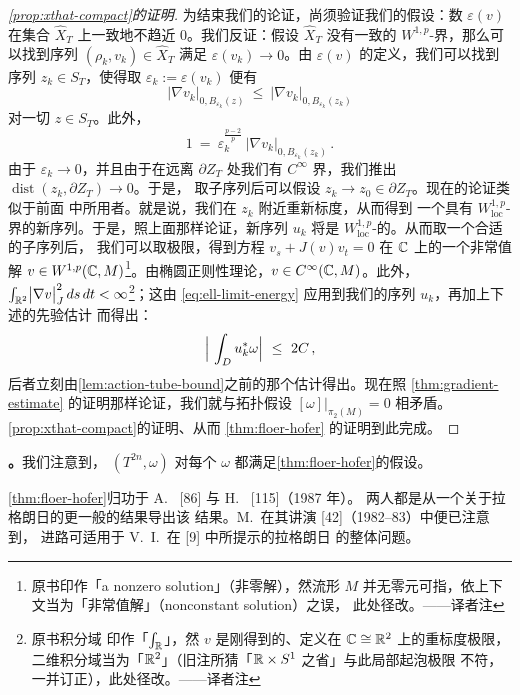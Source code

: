 \begin{proof}[\cref*{prop:xthat-compact}的证明]
为结束我们的论证，尚须验证我们的假设：数 $\varepsilon(v)$ 在集合%
$\hat{X}_{T}$ 上一致地不趋近 $0$。我们反证：假设 $\hat{X}_{T}$ 没有一致的%
$W^{1,p}$-界，那么可以找到序列 $(\rho_{k},v_{k})\in\hat{X}_{T}$ 满足%
$\varepsilon(v_{k})\to0$。由 $\varepsilon(v)$ 的定义，我们可以找到序列%
$z_{k}\in S_{T}$，使得取 $\varepsilon_{k}:=\varepsilon(v_{k})$ 便有
\[
\bigl|\nabla v_{k}\bigr|_{0,B_{\varepsilon_{k}}(z)}\ \leq\ \bigl|\nabla v_{k}\bigr|_{0,B_{\varepsilon_{k}}(z_{k})}
\]
对一切 $z\in S_{T}$。此外，
\[
1\ =\ \varepsilon_{k}^{\frac{p-2}{p}}\ \bigl|\nabla v_{k}\bigr|_{0,B_{\varepsilon_{k}}(z_{k})}\,.
\]
由于 $\varepsilon_{k}\to0$，并且由于在远离 $\partial Z_{T}$ 处我们有%
$C^{\infty}$ 界，我们推出 $\operatorname{dist}(z_{k},\partial Z_{T})\to0$。于是，%
取子序列后可以假设 $z_{k}\to z_{0}\in\partial Z_{T}$。现在的论证类似于前面%
\trBubblingOffAnalysis{}中所用者。就是说，我们在 $z_{k}$ 附近重新标度，从而得到%
一个具有 $W^{1,p}_{\mathrm{loc}}$-界的新序列。于是，照上面那样论证，新序列%
$u_{k}$ 将是 $W^{1,p}_{\mathrm{loc}}$-\trPrecompact{}的。从而取一个合适的子序列后，%
我们可以取极限，得到方程 $v_{s}+J(v)v_{t}=0$ 在 $\mathbb{C}$ 上的一个非常值解%
$v\in W^{1,p}(\mathbb{C},M)$\footnote{原书印作「a nonzero solution」（非零解），然流形%
$M$ 并无零元可指，依上下文当为「非常值解」（nonconstant solution）之误，%
此处径改。——译者注}。由椭圆正则性理论，$v\in C^{\infty}(\mathbb{C},M)$。此外，%
$\int_{\mathbb{R}^{2}}\bigl|\nabla v\bigr|^{2}_{J}\,ds\,dt<\infty$\footnote{原书积分域%
印作「$\int_{\mathbb{R}}$」，然 $v$ 是刚得到的、定义在 $\mathbb{C}\cong\mathbb{R}^{2}$ 上的重标度极限，%
二维积分域当为「$\mathbb{R}^{2}$」（旧注所猜「$\mathbb{R}\times S^{1}$ 之省」与此局部起泡极限%
不符，一并订正），此处径改。——译者注}；这由%
\eqref{eq:ell-limit-energy} 应用到我们的序列 $u_{k}$，再加上下述\trCapDisk{}的先验估计%
而得出：
\[
\Bigl|\ \int_{D}u_{k}^{*}\omega\Bigr|\ \leq\ 2C\,,
\]
后者立刻由\cref{lem:action-tube-bound}之前的那个估计得出。现在照%
\cref{thm:gradient-estimate} 的证明那样论证，我们就与拓扑假设%
$[\omega]\big|_{\pi_{2}(M)}=0$ 相矛盾。\cref{prop:xthat-compact}的证明、从而%
\cref{thm:floer-hofer} 的证明到此完成。
\end{proof}


\textbf{\trhRemark。}\quad 我们注意到，\trTorus{} $(T^{2n},\omega)$ 对每个%
\trSymplecticStructure{} $\omega$ 都满足\cref{thm:floer-hofer}的假设。

\cref{thm:floer-hofer}归功于 A.~\trFloer{} [86] 与 H.~\trHofer{} [115]（1987 年）。%
两人都是从一个关于\trCompact{}拉格朗日\trManifold{}的更一般的\trIntersection{}结果导出该%
结果。M.~\trChaperon{}在其\trBourbaki{}讲演 [42]（1982--83）中便已注意到，%
\trVariational{}进路可适用于 V.~I.~\trArnold{}在 [9] 中所提示的拉格朗日%
\trManifold{}的整体\trIntersection{}问题。

